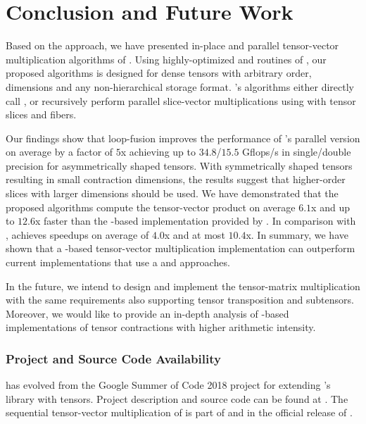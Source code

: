 \section{Conclusion and Future Work}
\label{sec:conclusion}
Based on the  approach, we have presented in-place and parallel tensor-vector multiplication algorithms of .
Using highly-optimized  and  routines of , our proposed algorithms is designed for dense tensors with arbitrary order, dimensions and any non-hierarchical storage format.
's algorithms either directly call ,  or recursively perform parallel slice-vector multiplications using  with tensor slices and fibers.

Our findings show that loop-fusion improves the performance of 's parallel version on average by a factor of $5$x achieving up to $34.8$/$15.5$ Gflops/s in single/double precision for asymmetrically shaped tensors. %
With symmetrically shaped tensors resulting in small contraction dimensions, the results suggest that higher-order slices with larger dimensions should be used.
We have demonstrated that the proposed algorithms compute the tensor-vector product on average $6.1$x and up to $12.6$x faster than the -based implementation provided by .
In comparison with ,  achieves speedups on average of $4.0$x and at most $10.4$x.
In summary, we have shown that a -based tensor-vector multiplication implementation can outperform current implementations that use a  and  approaches.

In the future, we intend to design and implement the tensor-matrix multiplication with the same requirements also supporting tensor transposition and subtensors.
Moreover, we would like to provide an in-depth analysis of -based implementations of tensor contractions with higher arithmetic intensity.
\subsubsection{Project and Source Code Availability}
 has evolved from the Google Summer of Code 2018 project for extending 's  library with tensors. 
Project description and source code can be found at {\footnotesize {}}.
The sequential tensor-vector multiplication of  is part of  and in the official release of  .
